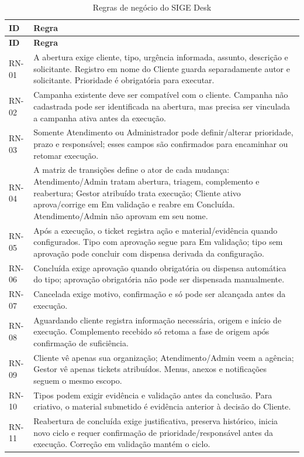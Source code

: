 \begin{longtable}{p{}p{}}
\caption{Regras de negócio do SIGE Desk}\label{tab:regras-negocio}\\
\hline
\textbf{ID} & \textbf{Regra} \\
\hline
\endfirsthead
\hline
\textbf{ID} & \textbf{Regra} \\
\hline
\endhead
RN-01 & A abertura exige cliente, tipo, urgência informada, assunto, descrição e solicitante. Registro em nome do Cliente guarda separadamente autor e solicitante. Prioridade é obrigatória para executar. \\
RN-02 & Campanha existente deve ser compatível com o cliente. Campanha não cadastrada pode ser identificada na abertura, mas precisa ser vinculada a campanha ativa antes da execução. \\
RN-03 & Somente Atendimento ou Administrador pode definir/alterar prioridade, prazo e responsável; esses campos são confirmados para encaminhar ou retomar execução. \\
RN-04 & A matriz de transições define o ator de cada mudança: Atendimento/Admin tratam abertura, triagem, complemento e reabertura; Gestor atribuído trata execução; Cliente ativo aprova/corrige em Em validação e reabre em Concluída. Atendimento/Admin não aprovam em seu nome. \\
RN-05 & Após a execução, o ticket registra ação e material/evidência quando configurados. Tipo com aprovação segue para Em validação; tipo sem aprovação pode concluir com dispensa derivada da configuração. \\
RN-06 & Concluída exige aprovação quando obrigatória ou dispensa automática do tipo; aprovação obrigatória não pode ser dispensada manualmente. \\
RN-07 & Cancelada exige motivo, confirmação e só pode ser alcançada antes da execução. \\
RN-08 & Aguardando cliente registra informação necessária, origem e início de execução. Complemento recebido só retoma a fase de origem após confirmação de suficiência. \\
RN-09 & Cliente vê apenas sua organização; Atendimento/Admin veem a agência; Gestor vê apenas tickets atribuídos. Menus, anexos e notificações seguem o mesmo escopo. \\
RN-10 & Tipos podem exigir evidência e validação antes da conclusão. Para criativo, o material submetido é evidência anterior à decisão do Cliente. \\
RN-11 & Reabertura de concluída exige justificativa, preserva histórico, inicia novo ciclo e requer confirmação de prioridade/responsável antes da execução. Correção em validação mantém o ciclo. \\

\end{longtable}

